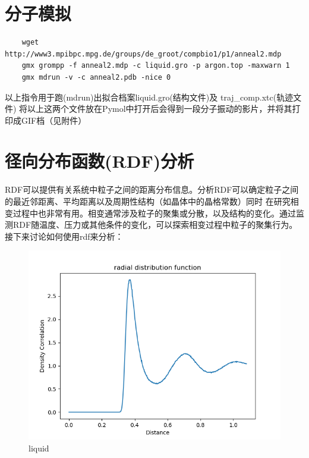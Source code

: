 \documentclass[12pt, a4paper, oneside]{ctexart}
\begin{document}
\begin{spacing}{2.0}
\section{分子模拟}
\begin{lstlisting}
    wget http://www3.mpibpc.mpg.de/groups/de_groot/compbio1/p1/anneal2.mdp
    gmx grompp -f anneal2.mdp -c liquid.gro -p argon.top -maxwarn 1
    gmx mdrun -v -c anneal2.pdb -nice 0
\end{lstlisting}
以上指令用于跑(mdrun)出拟合档案liquid.gro(结构文件)及 traj\_comp.xtc(轨迹文件)
将以上这两个文件放在Pymol中打开后会得到一段分子振动的影片，并将其打印成GIF档（见附件）
\section{径向分布函数(RDF)分析}
RDF可以提供有关系统中粒子之间的距离分布信息。分析RDF可以确定粒子之间的最近邻距离、平均距离以及周期性结构（如晶体中的晶格常数）同时
在研究相变过程中也非常有用。相变通常涉及粒子的聚集或分散，以及结构的变化。通过监测RDF随温度、压力或其他条件的变化，可以探索相变过程中粒子的聚集行为。
接下来讨论如何使用rdf来分析：
\begin{figure}[H]
    \begin{minipage}[t]{0.5\linewidth}
        \centering
        \includegraphics[scale=0.5]{radial distribution function.png}
        \caption{liquid}
        \label{fig:side:a}
      \end{minipage}%
      \begin{minipage}[t]{0.5\linewidth}
        \centering

\end{minipage}
\end{figure}
\end{spacing}
\end{document}
